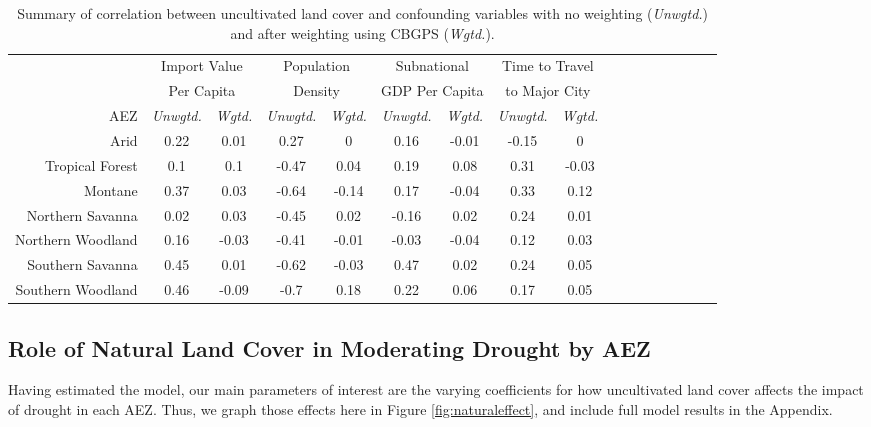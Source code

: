 \documentclass{article}
\begin{document}
\begin{table}[h!]
	\begin{center}
		\begin{tabular}{r | c c c c c c c c c c c c c c c c }
&	\multicolumn{2}{c}{Import Value} &	\multicolumn{2}{c}{Population} &	\multicolumn{2}{c}{Subnational}	&	\multicolumn{2}{c}{Time to Travel}	\\
&	\multicolumn{2}{c}{Per Capita} &	\multicolumn{2}{c}{Density} &	\multicolumn{2}{c}{GDP Per Capita}	&	\multicolumn{2}{c}{to Major City}	\\
	\cmidrule(lr){2-3}\cmidrule(lr){4-5} \cmidrule(lr){6-7}\cmidrule(lr){8-9}
      AEZ	&	\textit{Unwgtd.}	&	\textit{Wgtd.}	&	\textit{Unwgtd.}	&	\textit{Wgtd.}	&	\textit{Unwgtd.}	&	\textit{Wgtd.}	&	\textit{Unwgtd.}	&	\textit{Wgtd.}	\\
\hline									
Arid	&	0.22	&	0.01	&	0.27	&	0 &	0.16	&	-0.01	&	-0.15	&	0	\\
Tropical Forest	&	0.1	&	0.1	&	-0.47	&	0.04&	0.19	&	0.08	&	0.31	&	-0.03	\\
Montane	&	0.37	&	0.03	&	-0.64	&	-0.14&	0.17	&	-0.04	&	0.33	&	0.12	\\
Northern Savanna	&	0.02	&	0.03	&	-0.45	&	0.02&	-0.16	&	0.02	&	0.24	&	0.01	\\
Northern Woodland	&	0.16	&	-0.03	&	-0.41	&	-0.01&	-0.03	&	-0.04	&	0.12	&	0.03	\\
Southern Savanna	&	0.45	&	0.01	&	-0.62	&	-0.03&	0.47	&	0.02	&	0.24	&	0.05	\\
Southern Woodland	&	0.46	&	-0.09	&	-0.7	&	0.18&	0.22	&	0.06	&	0.17	&	0.05	\\	
		\end{tabular}
    \caption{Summary of correlation between uncultivated land cover and confounding variables with no weighting (\textit{Unwgtd.}) and after weighting using CBGPS (\textit{Wgtd.}).}
	\label{tab:CBPSsum}
	\end{center}
\end{table}

\subsection{Role of Natural Land Cover in Moderating Drought by AEZ}

Having estimated the model, our main parameters of interest are the varying coefficients for how uncultivated land cover affects the impact of drought in each AEZ.  Thus, we graph those effects here in Figure \ref{fig:naturaleffect}, and include full model results in the Appendix.
\end{document}
